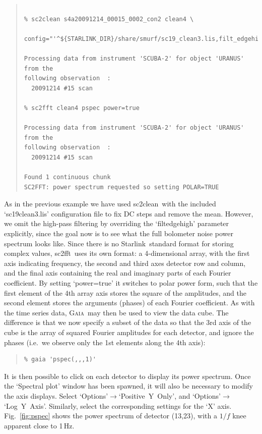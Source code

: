 \documentclass[twoside,11pt]{article}
\newcommand{\htmladdnormallink}[2]{#1}
\newcommand{\xref}[3]{#1}
\renewcommand{\_}{\texttt{\symbol{95}}}
\newenvironment{myquote}{\begin{quote}\begin{small}}{\end{small}\end{quote}}
\newcommand{\starlink}{\htmladdnormallink{Starlink}{http://starlink.jach.hawaii.edu}}
\newcommand{\gaia}{\xref{\textsc{Gaia}}{sun214}{}}
\newcommand{\task}[1]{\textsf{#1}}
\newcommand{\fft}{\xref{\task{sc2fft}}{sun258}{SC2FFT}}
\newcommand{\clean}{\xref{\task{sc2clean}}{sun258}{SC2CLEAN}}
\begin{document}
\begin{myquote}
\begin{verbatim}

% sc2clean s4a20091214_00015_0002_con2 clean4 \
   config="'^${STARLINK_DIR}/share/smurf/sc19_clean3.lis,filt_edgehigh=0'"

Processing data from instrument 'SCUBA-2' for object 'URANUS' from the
following observation  :
  20091214 #15 scan

% sc2fft clean4 pspec power=true

Processing data from instrument 'SCUBA-2' for object 'URANUS' from the
following observation  :
  20091214 #15 scan

Found 1 continuous chunk
SC2FFT: power spectrum requested so setting POLAR=TRUE

\end{verbatim}
\end{myquote}

As in the previous example we have used \clean\ with the included
`sc19\_clean3.lis' configuration file to fix DC steps and remove the
mean. However, we omit the high-pass filtering by overriding the
`filt\_edgehigh' parameter explicitly, since the goal now is to see
what the full bolometer noise power spectrum looks like. Since there
is no \starlink\ standard format for storing complex values,
\fft\ uses its own format: a 4-dimensional array, with the first axis
indicating frequency, the second and third axes detector row and
column, and the final axis containing the real and imaginary parts of
each Fourier coefficient. By setting `power=true' it switches to polar
power form, such that the first element of the 4th array axis stores
the square of the amplitudes, and the second element stores the
arguments (phases) of each Fourier coefficient. As with the time
series data, \gaia\ may then be used to view the data cube. The
difference is that we now specify a subset of the data so that the 3rd
axis of the cube is the array of squared Fourier amplitudes for each
detector, and ignore the phases (i.e.~we observe only the 1st elements
along the 4th axis):

\begin{myquote}
\begin{verbatim}
% gaia 'pspec(,,,1)'
\end{verbatim}
\end{myquote}

It is then possible to click on each detector to display its power
spectrum. Once the `Spectral plot' window has been spawned, it will
also be necessary to modify the axis displays. Select
`Options'$\rightarrow$`Positive~Y~Only', and
`Options'$\rightarrow$`Log~Y~Axis'. Similarly, select the
corresponding settings for the `X' axis. Fig.~\ref{fig:pspec} shows
the power spectrum of detector (13,23), with a $1/f$ knee apparent
close to 1\,Hz.
\end{document}
